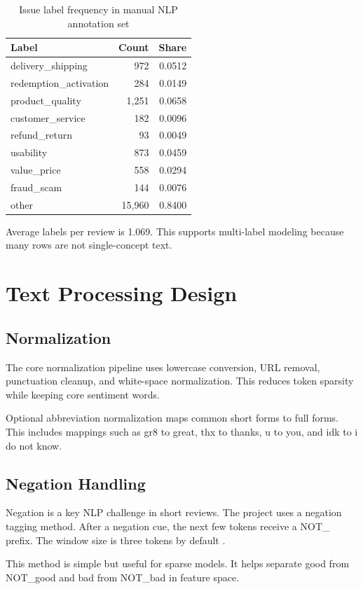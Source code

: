 \documentclass[12pt,a4paper]{article}
\begin{document}
\begin{table}[H]
\centering
\caption{Issue label frequency in manual NLP annotation set}
\label{tab:nlp_issue_frequency}
\begin{tabular}{lrr}
\toprule
Label & Count & Share \\
\midrule
delivery\_shipping & 972 & 0.0512 \\
redemption\_activation & 284 & 0.0149 \\
product\_quality & 1,251 & 0.0658 \\
customer\_service & 182 & 0.0096 \\
refund\_return & 93 & 0.0049 \\
usability & 873 & 0.0459 \\
value\_price & 558 & 0.0294 \\
fraud\_scam & 144 & 0.0076 \\
other & 15,960 & 0.8400 \\
\bottomrule
\end{tabular}
\end{table}

Average labels per review is 1.069. This supports multi-label modeling because many rows are not single-concept text.

\section{Text Processing Design}
\subsection{Normalization}
The core normalization pipeline uses lowercase conversion, URL removal, punctuation cleanup, and white-space normalization. This reduces token sparsity while keeping core sentiment words.

Optional abbreviation normalization maps common short forms to full forms. This includes mappings such as gr8 to great, thx to thanks, u to you, and idk to i do not know.

\subsection{Negation Handling}
Negation is a key NLP challenge in short reviews. The project uses a negation tagging method. After a negation cue, the next few tokens receive a NOT\_ prefix. The window size is three tokens by default \cite{wiegand2010}.

This method is simple but useful for sparse models. It helps separate good from NOT\_good and bad from NOT\_bad in feature space.
\end{document}
